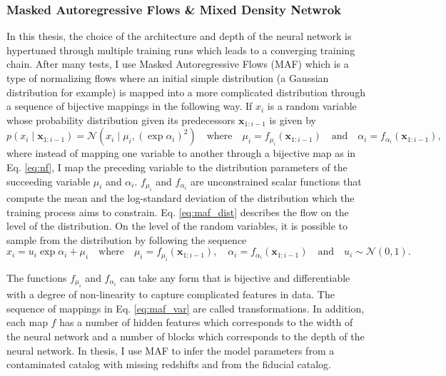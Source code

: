 \subsubsection{Masked Autoregressive Flows \& Mixed Density Netwrok}\label{meth_sec:maf}
In this thesis, the choice of the architecture and depth of the neural network is hypertuned through multiple training runs which leads to a converging training chain. After many tests, I use Masked Autoregressive Flows (MAF) which is a type of normalizing flows where an initial simple distribution (a Gaussian distribution for example) is mapped into a more complicated distribution through a sequence of bijective mappings in the following way.
If $x_i$ is a random variable whose probability distribution given its predecessors $\mathbf{x}_{1:i - 1}$ is given by
\begin{equation} \label{eq:maf_dist}
    p(x_i \mid \mathbf{x}_{1:i-1}) = \mathcal{N}\!\left(x_i \mid \mu_i, (\exp \alpha_i)^2\right) \quad \text{where} \quad \mu_i = f_{\mu_i}(\mathbf{x}_{1:i-1}) \quad \text{and} \quad \alpha_i = f_{\alpha_i}(\mathbf{x}_{1:i-1}),
\end{equation}
where instead of mapping one variable to another through a bijective map as in Eq. \ref{eq:nf}, I map the preceding variable to the distribution parameters of the succeeding variable $\mu_i$ and $\alpha_i$. $f_{\mu_i}$ and $f_{\alpha_i}$ are unconstrained scalar functions that compute the mean and the log-standard deviation of the distribution which the training process aims to constrain. Eq. \ref{eq:maf_dist} describes the flow on the level of the distribution. On the level of the random variables, it is possible to sample from the distribution by following the sequence
\begin{equation}\label{eq:maf_var}
    x_i = u_i \exp \alpha_i + \mu_i \quad \text{where} \quad \mu_i = f_{\mu_i}(\mathbf{x}_{1:i-1}), \quad \alpha_i = f_{\alpha_i}(\mathbf{x}_{1:i-1}) \quad \text{and} \quad u_i \sim \mathcal{N}(0, 1).
\end{equation}

The functions $f_{\mu_i}$ and $f_{\alpha_i}$ can take any form that is bijective and differentiable with a degree of non-linearity to capture complicated features in data. The sequence of mappings in Eq. \ref{eq:maf_var} are called transformations. In addition, each map $f$ has a number of hidden features which corresponds to the width of the neural network and a number of blocks which corresponds to the depth of the neural network. In thesis, I use MAF to infer the model parameters from a contaminated catalog with missing redshifts and from the fiducial catalog.


